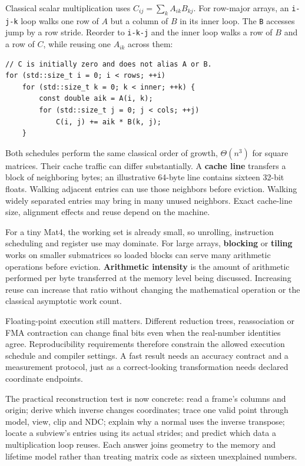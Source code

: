 Classical scalar multiplication uses \(C_{ij}=\sum_k A_{ik}B_{kj}\). For row-major arrays, an \texttt{i-j-k} loop walks one row of \(A\) but a column of \(B\) in its inner loop. The \texttt{B} accesses jump by a row stride. Reorder to \texttt{i-k-j} and the inner loop walks a row of \(B\) and a row of \(C\), while reusing one \(A_{ik}\) across them:

\begin{verbatim}
// C is initially zero and does not alias A or B.
for (std::size_t i = 0; i < rows; ++i)
    for (std::size_t k = 0; k < inner; ++k) {
        const double aik = A(i, k);
        for (std::size_t j = 0; j < cols; ++j)
            C(i, j) += aik * B(k, j);
    }
\end{verbatim}

Both schedules perform the same classical order of growth, \(\Theta(n^3)\) for square matrices. Their cache traffic can differ substantially. A \textbf{cache line} transfers a block of neighboring bytes; an illustrative 64-byte line contains sixteen 32-bit floats. Walking adjacent entries can use those neighbors before eviction. Walking widely separated entries may bring in many unused neighbors. Exact cache-line size, alignment effects and reuse depend on the machine.

For a tiny Mat4, the working set is already small, so unrolling, instruction scheduling and register use may dominate. For large arrays, \textbf{blocking} or \textbf{tiling} works on smaller submatrices so loaded blocks can serve many arithmetic operations before eviction. \textbf{Arithmetic intensity} is the amount of arithmetic performed per byte transferred at the memory level being discussed. Increasing reuse can increase that ratio without changing the mathematical operation or the classical asymptotic work count.

Floating-point execution still matters. Different reduction trees, reassociation or FMA contraction can change final bits even when the real-number identities agree. Reproducibility requirements therefore constrain the allowed execution schedule and compiler settings. A fast result needs an accuracy contract and a measurement protocol, just as a correct-looking transformation needs declared coordinate endpoints.

The practical reconstruction test is now concrete: read a frame's columns and origin; derive which inverse changes coordinates; trace one valid point through model, view, clip and NDC; explain why a normal uses the inverse transpose; locate a subview's entries using its actual strides; and predict which data a multiplication loop reuses. Each answer joins geometry to the memory and lifetime model rather than treating matrix code as sixteen unexplained numbers.

